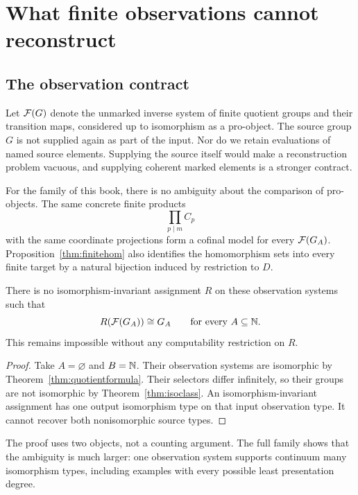 \chapter{What finite observations cannot reconstruct}
\label{ch:reconstruction}

\section{The observation contract}
Let $\mathcal F(G)$ denote the unmarked inverse system of finite quotient groups and their transition maps, considered up to isomorphism as a pro-object. The source group $G$ is not supplied again as part of the input. Nor do we retain evaluations of named source elements. Supplying the source itself would make a reconstruction problem vacuous, and supplying coherent marked elements is a stronger contract.

For the family of this book, there is no ambiguity about the comparison of pro-objects. The same concrete finite products
\[
\prod_{p\mid m}C_p
\]
with the same coordinate projections form a cofinal model for every $\mathcal F(G_A)$. Proposition~\ref{thm:finitehom} also identifies the homomorphism sets into every finite target by a natural bijection induced by restriction to $D$.

\begin{theorem}
\label{thm:nodecoder}
There is no isomorphism-invariant assignment $R$ on these observation systems such that
\[
R(\mathcal F(G_A))\cong G_A
\qquad\text{for every }A\subseteq\mathbb N.
\]
This remains impossible without any computability restriction on $R$.
\end{theorem}
\begin{proof}
Take $A=\varnothing$ and $B=\mathbb N$. Their observation systems are isomorphic by Theorem~\ref{thm:quotientformula}. Their selectors differ infinitely, so their groups are not isomorphic by Theorem~\ref{thm:isoclass}. An isomorphism-invariant assignment has one output isomorphism type on that input observation type. It cannot recover both nonisomorphic source types.
\end{proof}
The proof uses two objects, not a counting argument. The full family shows that the ambiguity is much larger: one observation system supports continuum many isomorphism types, including examples with every possible least presentation degree.

